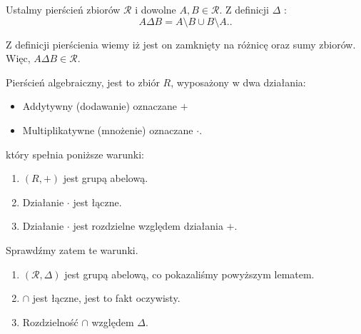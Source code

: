 \begin{solution}

	Ustalmy pierścień zbiorów $\mathcal{R}$ i dowolne $A,B \in \mathcal{R}$. Z definicji $\Delta $ :
	\[
	A\Delta B = A\setminus B \cup B\setminus A.
	.\] 
	
	Z definicji pierścienia wiemy iż jest on zamknięty na różnicę oraz sumy zbiorów. Więc, $A\Delta B\in \mathcal{R}$.

	Pierścień algebraiczny, jest to zbiór $R$, wyposażony w dwa działania:
	\begin{itemize}
		\item Addytywny (dodawanie) oznaczane $+$
		\item  Multiplikatywne (mnożenie) oznaczane $\cdot $.
	\end{itemize}
	który spełnia poniższe warunki:
	\begin{enumerate}[label=A\arabic*.]
		\item $(R, +) $ jest grupą abelową.
		\item Działanie  $\cdot $ jest łączne.
		\item  Działanie $\cdot $ jest rozdzielne względem działania $+$.
	\end{enumerate}

Sprawdźmy zatem te warunki.

\begin{enumerate}[label=A\arabic*.]
	\item $\left( \mathcal{R}, \Delta  \right) $ jest grupą abelową, co pokazaliśmy powyższym lematem.
	\item $\cap $ jest łączne, jest to fakt oczywisty.
	\item Rozdzielność $\cap $ względem $\Delta $.


\end{enumerate}
\end{solution}
